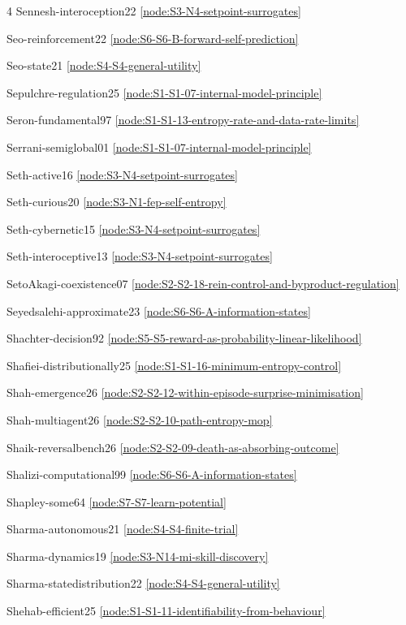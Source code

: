 \documentclass[10pt]{article}
\begin{document}
{\begin{multicols}{4}
Sennesh-interoception22 \hfill \ref{node:S3-N4-setpoint-surrogates}\par
Seo-reinforcement22 \hfill \ref{node:S6-S6-B-forward-self-prediction}\par
Seo-state21 \hfill \ref{node:S4-S4-general-utility}\par
Sepulchre-regulation25 \hfill \ref{node:S1-S1-07-internal-model-principle}\par
Seron-fundamental97 \hfill \ref{node:S1-S1-13-entropy-rate-and-data-rate-limits}\par
Serrani-semiglobal01 \hfill \ref{node:S1-S1-07-internal-model-principle}\par
Seth-active16 \hfill \ref{node:S3-N4-setpoint-surrogates}\par
Seth-curious20 \hfill \ref{node:S3-N1-fep-self-entropy}\par
Seth-cybernetic15 \hfill \ref{node:S3-N4-setpoint-surrogates}\par
Seth-interoceptive13 \hfill \ref{node:S3-N4-setpoint-surrogates}\par
SetoAkagi-coexistence07 \hfill \ref{node:S2-S2-18-rein-control-and-byproduct-regulation}\par
Seyedsalehi-approximate23 \hfill \ref{node:S6-S6-A-information-states}\par
Shachter-decision92 \hfill \ref{node:S5-S5-reward-as-probability-linear-likelihood}\par
Shafiei-distributionally25 \hfill \ref{node:S1-S1-16-minimum-entropy-control}\par
Shah-emergence26 \hfill \ref{node:S2-S2-12-within-episode-surprise-minimisation}\par
Shah-multiagent26 \hfill \ref{node:S2-S2-10-path-entropy-mop}\par
Shaik-reversalbench26 \hfill \ref{node:S2-S2-09-death-as-absorbing-outcome}\par
Shalizi-computational99 \hfill \ref{node:S6-S6-A-information-states}\par
Shapley-some64 \hfill \ref{node:S7-S7-learn-potential}\par
Sharma-autonomous21 \hfill \ref{node:S4-S4-finite-trial}\par
Sharma-dynamics19 \hfill \ref{node:S3-N14-mi-skill-discovery}\par
Sharma-statedistribution22 \hfill \ref{node:S4-S4-general-utility}\par
Shehab-efficient25 \hfill \ref{node:S1-S1-11-identifiability-from-behaviour}\par

\end{multicols}}
\end{document}
